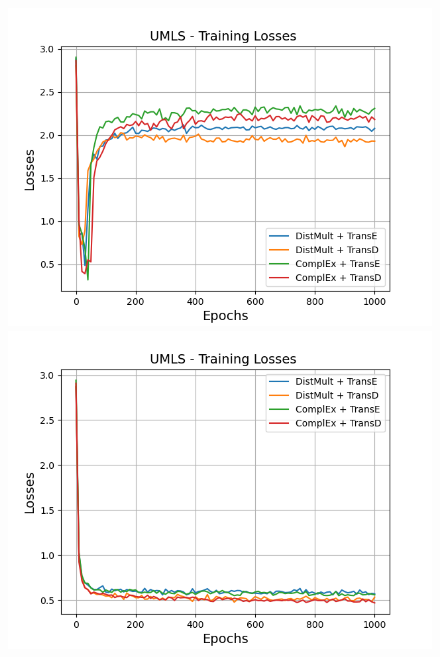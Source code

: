 \begin{figure}[H]
    \centering
    \begin{minipage}{.5\textwidth}
      \centering
      \includegraphics[width=0.9\linewidth]{figures/results/gan_train/not_pretrained/uncertainty/max/entropy/umls/1k_epochs/uncertainty_umls_losses.png}
    \end{minipage}%
    \begin{minipage}{.5\textwidth}
      \centering
      \includegraphics[width=0.9\linewidth]{figures/results/gan_train/not_pretrained/uncertainty/max_distribution/entropy/umls/1k_epochs/uncertainty_umls_losses.png}
    \end{minipage}
    \begin{minipage}{.5\textwidth}
      \centering

\end{minipage}
\end{figure}

